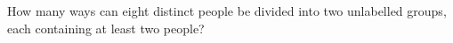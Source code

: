 How many ways can eight distinct people be divided into two unlabelled groups, each containing at least two people?
